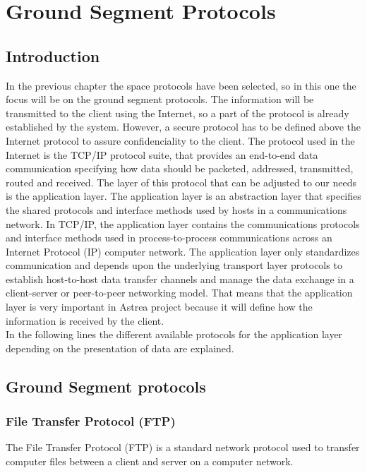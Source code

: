 \chapter{Ground Segment Protocols}

\section{Introduction}
In the previous chapter the space protocols have been selected, so in this one the focus will be on the ground segment protocols. The information will be transmitted to the client using the Internet, so a part of the protocol is already established by the system. However, a secure protocol has to be defined above the Internet protocol to assure confidenciality to the client. The protocol used in the Internet is the TCP/IP protocol suite, that provides an end-to-end data communication specifying how data should be packeted, addressed, transmitted, routed and received. The layer of this protocol that can be adjusted to our needs is the application layer. The application layer is an abstraction layer that specifies the shared protocols and interface methods used by hosts in a communications network. In TCP/IP, the application layer contains the communications protocols and interface methods used in process-to-process communications across an Internet Protocol (IP) computer network. The application layer only standardizes communication and depends upon the underlying transport layer protocols to establish host-to-host data transfer channels and manage the data exchange in a client-server or peer-to-peer networking model. That means that the application layer is very important in Astrea project because it will define how the information is received by the client.\\
In the following lines the different available protocols for the application layer depending on the presentation of data are explained.

\section{Ground Segment protocols}

\subsection{File Transfer Protocol (FTP)} 
The File Transfer Protocol (FTP) is a standard network protocol used to transfer computer files between a client and server on a computer network.

